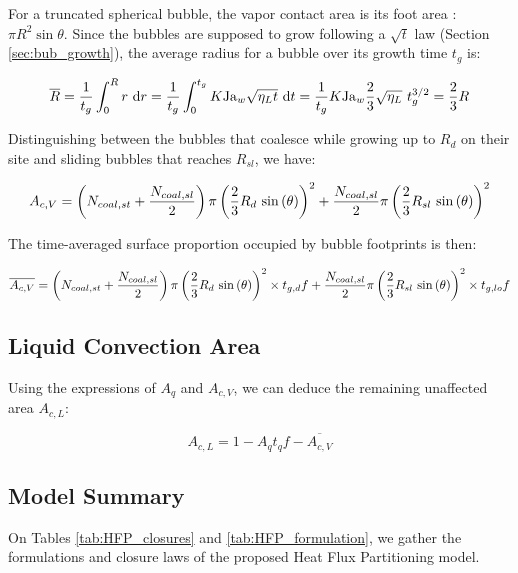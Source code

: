 For a truncated spherical bubble, the vapor contact area is its foot area : $\pi R^{2}\sin{\theta}$. Since the bubbles are supposed to grow following a $\sqrt{t}$ law (Section \ref{sec:bub_growth}), the average radius for a bubble over its growth time $t_{g}$ is:

\begin{equation}
\overline{R} = \frac{1}{t_{g}}\int_{0}^{R}r\ \mathrm{d}r = \frac{1}{t_{g}} \int_{0}^{t_{g}} K\mathrm{Ja}_{w}\sqrt{\eta_{L}t}~\mathrm{d}t = \frac{1}{t_{g}} K\mathrm{Ja}_{w} \frac{2}{3}\sqrt{\eta_{L}}~t_{g}^{3/2} = \frac{2}{3}R
\end{equation}

Distinguishing between the bubbles that coalesce while growing up to $R_{d}$ on their site and sliding bubbles that reaches $R_{sl}$, we have:

\begin{equation}
A_{c,V} = \parth{N_{coal,st} + \dfrac{N_{coal,sl}}{2}}\pi \parth{\dfrac{2}{3}R_{d}\ \sin{\theta}}^{2} + \dfrac{N_{coal,sl}}{2}\pi \parth{\dfrac{2}{3}R_{sl}\ \sin{\theta}}^{2}
\end{equation}

The time-averaged surface proportion occupied by bubble footprints is then:

\begin{equation}
\overline{A_{c,V}} =  \parth{N_{coal,st} + \dfrac{N_{coal,sl}}{2}}\pi \parth{\dfrac{2}{3}R_{d}\ \sin{\theta}}^{2} \times t_{g,d}f + \dfrac{N_{coal,sl}}{2}\pi \parth{\dfrac{2}{3}R_{sl}\ \sin{\theta}}^{2} \times t_{g,lo} f
\end{equation}


\subsection{Liquid Convection Area}

Using the expressions of $A_{q}$ and $A_{c,V}$, we can deduce the remaining unaffected area $A_{c,L}$:

\begin{equation}
A_{c,L} = 1 - A_{q}t_{q}f - \overline{A_{c,V}}
\end{equation}

\subsection{Model Summary}

On Tables \ref{tab:HFP_closures} and \ref{tab:HFP_formulation}, we gather the formulations and closure laws of the proposed Heat Flux Partitioning model.

